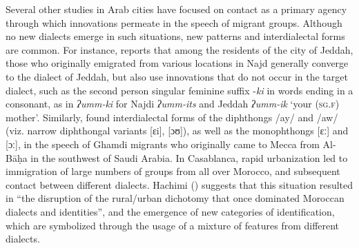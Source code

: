 \documentclass[output=paper]{langsci/langscibook}
\begin{document}
Several other studies in Arab cities have focused on contact as a primary agency through which innovations permeate in the speech of migrant groups. Although no new dialects emerge in such situations, new patterns and interdialectal forms are common. For instance, \citet{Al-Essa2009} reports that among the residents of the city of Jeddah, those who originally emigrated from various locations in Najd generally converge to the dialect of Jeddah, but also use innovations that do not occur in the target dialect, such as the second person singular feminine suffix -\textit{ki} in words ending in a consonant, as in \textit{ʔumm-ki} for Najdi \textit{ʔumm-its} and Jeddah \textit{ʔumm-ik} ‘your (\textsc{sg.f}) mother’. Similarly, \citet{Alghamdi2014} found interdialectal forms of the diphthongs /ay/ and /aw/ (viz. narrow diphthongal variants [ɛi], [ɔʊ]), as well as the monophthongs [ɛː] and [ɔː], in the speech of Ghamdi migrants who originally came to Mecca from Al-Bāḥa in the southwest of Saudi Arabia. In Casablanca, rapid urbanization led to immigration of large numbers of groups from all over Morocco, and subsequent contact between different dialects. Hachimi (\citeyear[97]{Hachimi2007}) suggests that this situation resulted in “the disruption of the rural/urban dichotomy that once dominated Moroccan dialects and identities”, and the emergence of new categories of identification, which are symbolized through the usage of a mixture of features from different dialects.
\end{document}
